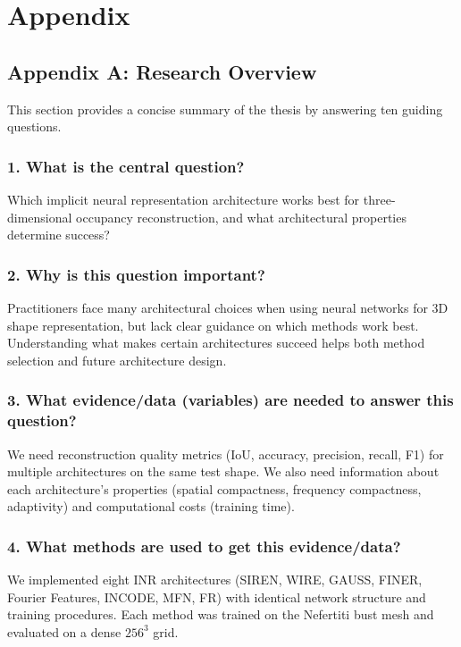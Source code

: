 \chapter{Appendix}
\label{ch:appendix}

\section*{Appendix A: Research Overview}

This section provides a concise summary of the thesis by answering ten guiding questions.

\subsection*{1. What is the central question?}
Which implicit neural representation architecture works best for three-dimensional occupancy reconstruction, and what architectural properties determine success?

\subsection*{2. Why is this question important?}
Practitioners face many architectural choices when using neural networks for 3D shape representation, but lack clear guidance on which methods work best. Understanding what makes certain architectures succeed helps both method selection and future architecture design.

\subsection*{3. What evidence/data (variables) are needed to answer this question?}
We need reconstruction quality metrics (IoU, accuracy, precision, recall, F1) for multiple architectures on the same test shape. We also need information about each architecture's properties (spatial compactness, frequency compactness, adaptivity) and computational costs (training time).

\subsection*{4. What methods are used to get this evidence/data?}
We implemented eight INR architectures (SIREN, WIRE, GAUSS, FINER, Fourier Features, INCODE, MFN, FR) with identical network structure and training procedures. Each method was trained on the Nefertiti bust mesh and evaluated on a dense $256^3$ grid.

